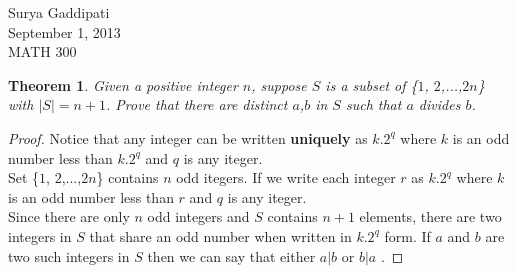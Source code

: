 \documentclass[12pt]{article}
\begin{document}
 

Surya Gaddipati\\
September 1, 2013\\
MATH 300 

\newtheorem*{KL}{Theorem }

\begin{KL} 
Given a positive integer $n$, suppose $S$ is a subset of \{$1$, $2$,...,$2n$\} with $|S| = n + 1$. Prove that there are distinct $a$,$b$ in $S$ such that $a$ divides $b$.
\end{KL}
\begin{proof}
  Notice that any integer can be written {\bf uniquely}  as $k.2^q$ where $k$ is an odd number less than  $k.2^q$ and $q$ is any iteger.\\
  Set \{$1$, $2$,...,$2n$\} contains $n$ odd itegers. 
  If we write each integer $r$ as $k.2^q$ where $k$ is an odd number less than  $r$ and $q$ is any iteger.\\ 
  Since there are only $n$ odd integers  and $S$ contains $n+1$ elements, there are two integers in $S$ that share an odd number when written in $k.2^q$ form. If $a$ and $b$ are two such integers in $S$ then we can say that either $a|b$ or $b|a$ .


\end{proof}
\end{document}
